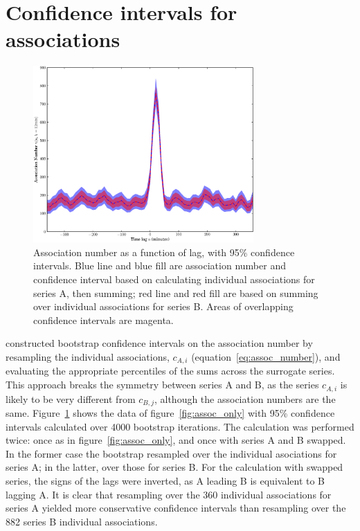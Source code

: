 \documentclass[letterpaper,11pt]{article}
\begin{document}
\section{Confidence intervals for associations}
\label{sec:ci}
\begin{figure}
\begin{center}
\includegraphics[width=0.75\textwidth]{figures/forward_vs_reverse.eps}
\caption{\label{fig:forward_reverse}Association number as a function
of lag, with 95\% confidence intervals. Blue line and blue fill are
association number and confidence interval based on calculating
individual associations for series A, then summing; red line and red
fill are based on summing over individual associations for series B.
Areas of overlapping confidence intervals are magenta.}
\end{center}
\end{figure}

\citet{2007GeoRL..3408104M} constructed bootstrap confidence intervals
on the association number by resampling the individual associations,
$c_{A,i}$ (equation~\ref{eq:assoc_number}), and evaluating the
appropriate percentiles of the sums across the surrogate series. This
approach breaks the symmetry between series A and B, as the series
$c_{A,i}$ is likely to be very different from $c_{B,j}$, although the
association numbers are the same. Figure~\ref{fig:forward_reverse}
shows the data of figure~\ref{fig:assoc_only} with 95\% confidence
intervals calculated over 4000 bootstrap iterations. The calculation
was performed twice: once as in figure~\ref{fig:assoc_only}, and once
with series A and B swapped. In the former case the bootstrap
resampled over the individual asociations for series A; in the latter,
over those for series B. For the calculation with swapped series, the
signs of the lags were inverted, as A leading B is equivalent to B
lagging A. It is clear that resampling over the 360 individual
associations for series A yielded more conservative confidence
intervals than resampling over the 882 series B individual
associations.
\end{document}
